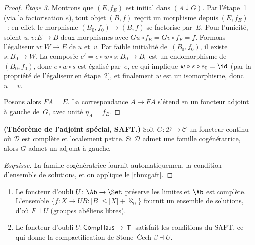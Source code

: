 \begin{proof}
\emph{Étape 3.} Montrons que $(E,f_E)$ est initial dans $(A\downarrow G)$.
Par l'étape~1 (via la factorisation $e$), tout objet $(B,f)$ reçoit un
morphisme depuis $(E,f_E)$~: en effet, le morphisme $(B_0,f_0)\to(B,f)$
se factorise par~$E$.
Pour l'unicité, soient $u,v\colon E\to B$ deux morphismes avec
$Gu\circ f_E = Gv\circ f_E = f$.
Formons l'égaliseur $w\colon W\to E$ de $u$ et~$v$.
Par faible initialité de~$(B_0,f_0)$, il existe $s\colon B_0\to W$.
La composée $e' = e\circ w\circ s\colon B_0\to B_0$
est un endomorphisme de $(B_0,f_0)$, donc $e\circ w\circ s$ est égalisé
par~$e$, ce qui implique $w\circ s\circ e_0 = \id$ (par la propriété
de l'égaliseur en étape~2), et finalement $w$ est un isomorphisme,
donc $u=v$.

Posons alors $FA = E$. La correspondance $A\mapsto FA$ s'étend
en un foncteur adjoint à gauche de~$G$, avec unité $\eta_A = f_E$.
\end{proof}

\begin{corollaire}\label{cor:saft}
\textbf{(Théorème de l'adjoint spécial, SAFT.)}
Soit $G\colon\mathcal{D}\to\mathcal{C}$ un foncteur continu
où $\mathcal{D}$ est complète et localement petite.
Si $\mathcal{D}$ admet une famille cogénératrice,
alors $G$ admet un adjoint à gauche.
\end{corollaire}

\begin{proof}[Esquisse]
La famille cogénératrice fournit automatiquement la condition d'ensemble
de solutions, et on applique le \autoref{thm:gaft}.
\end{proof}

\begin{exemple}\label{ex:applications-gaft}
\begin{enumerate}[label=(\roman*)]
\item {}
      Le foncteur d'oubli $U\colon\Ab\to\Set$ préserve les limites
      et $\Ab$ est complète. L'ensemble $\{f\colon X\to UB : |B|\leq|X|+\aleph_0\}$
      fournit un ensemble de solutions, d'où $F\dashv U$ (groupes abéliens libres).
\item {}
      Le foncteur d'oubli $U\colon\mathsf{CompHaus}\to\Top$
      satisfait les conditions du SAFT, ce qui donne la
      compactification de Stone--Čech $\beta\dashv U$.
\end{enumerate}
\end{exemple}


